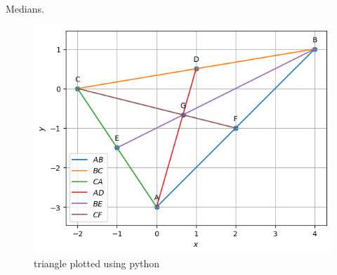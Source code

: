 \begin{table}[H]
        \centering
        
        \caption{Medians.}
        \label{tab:median}
    \end{table}
\begin{figure}[H]
	\includegraphics[width=\columnwidth]{median/figs/median.png}
\caption{triangle plotted using python}
\label{fig:i_median_py}
\end{figure}

